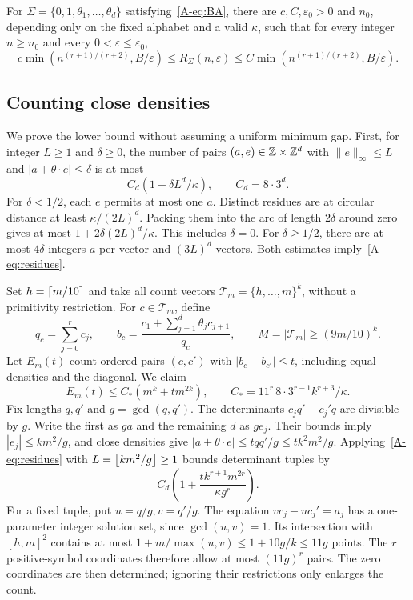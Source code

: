 \begin{theorem}\label{A-thm:BA}
For $\Sigma=\{0,1,\theta_1,\ldots,\theta_d\}$ satisfying~\eqref{A-eq:BA}, there are $c,C,\varepsilon_0>0$ and $n_0$, depending only on the fixed alphabet and a valid $\kappa$, such that for every integer $n\ge n_0$ and every $0<\varepsilon\le\varepsilon_0$,
\begin{equation}\label{A-eq:main}
c\min(n^{(r+1)/(r+2)},B/\varepsilon)\le R_\Sigma(n,\varepsilon)
\le C\min(n^{(r+1)/(r+2)},B/\varepsilon).
\end{equation}
\end{theorem}

\subsection{Counting close densities}
We prove the lower bound without assuming a uniform minimum gap. First, for integer $L\ge1$ and $\delta\ge0$, the number of pairs $(a,e)\in\mathbb Z\times\mathbb Z^d$ with $\|e\|_\infty\le L$ and $|a+\theta\cdot e|\le\delta$ is at most
\begin{equation}\label{A-eq:residues}
C_d(1+\delta L^d/\kappa),\qquad C_d=8\cdot3^d.
\end{equation}
For $\delta<1/2$, each $e$ permits at most one $a$. Distinct residues are at circular distance at least $\kappa/(2L)^d$. Packing them into the arc of length $2\delta$ around zero gives at most $1+2\delta(2L)^d/\kappa$. This includes $\delta=0$. For $\delta\ge1/2$, there are at most $4\delta$ integers $a$ per vector and $(3L)^d$ vectors. Both estimates imply~\eqref{A-eq:residues}.

Set $h=\left\lceil m/10\right\rceil$ and take all count vectors $\mathcal T_m=\{h,\ldots,m\}^k$, without a primitivity restriction. For $c\in\mathcal T_m$, define
\begin{equation}\label{A-eq:density}
q_c=\sum_{j=0}^r c_j,\qquad
b_c=\frac{c_1+\sum_{j=1}^d\theta_jc_{j+1}}{q_c},\qquad
M=|\mathcal T_m|\ge(9m/10)^k.
\end{equation}
Let $E_m(t)$ count ordered pairs $(c,c')$ with $|b_c-b_{c'}|\le t$, including equal densities and the diagonal. We claim
\begin{equation}\label{A-eq:pairs}
E_m(t)\le C_*(m^k+t m^{2k}),\qquad
C_*=11^r\,8\cdot3^{r-1}k^{r+3}/\kappa.
\end{equation}
Fix lengths $q,q'$ and $g=\gcd(q,q')$. The determinants $c_jq'-c_j'q$ are divisible by $g$. Write the first as $ga$ and the remaining $d$ as $ge_j$. Their bounds imply $|e_j|\le km^2/g$, and close densities give $|a+\theta\cdot e|\le tqq'/g\le tk^2m^2/g$. Applying~\eqref{A-eq:residues} with $L=\left\lfloor km^2/g\right\rfloor\ge1$ bounds determinant tuples by
\begin{equation}\label{A-eq:determinants}
C_d\left(1+\frac{t k^{r+1}m^{2r}}{\kappa g^r}\right).
\end{equation}
For a fixed tuple, put $u=q/g,v=q'/g$. The equation $vc_j-uc_j'=a_j$ has a one-parameter integer solution set, since $\gcd(u,v)=1$. Its intersection with $[h,m]^2$ contains at most $1+m/\max(u,v)\le1+10g/k\le11g$ points. The $r$ positive-symbol coordinates therefore allow at most $(11g)^r$ pairs. The zero coordinates are then determined; ignoring their restrictions only enlarges the count.


